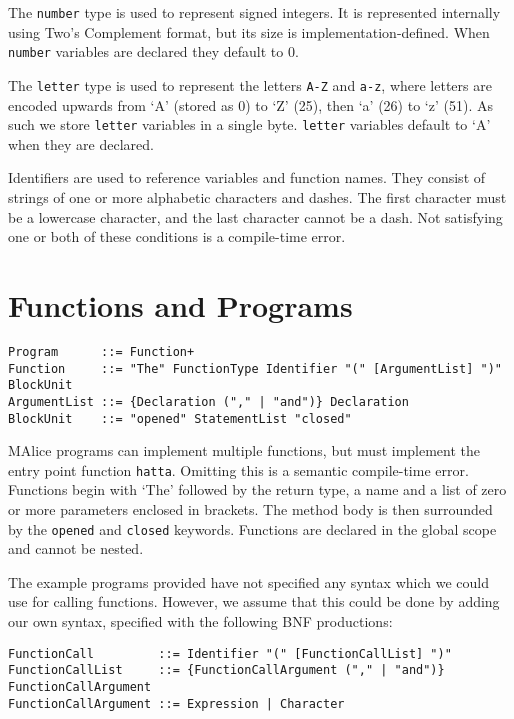 \documentclass[a4wide, 11pt]{article}
\begin{document}
The \texttt{number} type is used to represent signed integers. It is represented internally using Two's Complement format, but its size is implementation-defined. When \texttt{number} variables are declared they default to 0.

The \texttt{letter} type is used to represent the letters \texttt{A-Z} and \texttt{a-z}, where letters are encoded upwards from `A' (stored as 0) to `Z' (25), then `a' (26) to `z' (51). As such we store \texttt{letter} variables in a single byte. \texttt{letter} variables default to `A' when they are declared.

Identifiers are used to reference variables and function names. They consist of strings of one or more alphabetic characters and dashes. The first character must be a lowercase character, and the last character cannot be a dash. Not satisfying one or both of these conditions is a compile-time error.

\section{Functions and Programs}

\begin{verbatim}
Program      ::= Function+
Function     ::= "The" FunctionType Identifier "(" [ArgumentList] ")" BlockUnit
ArgumentList ::= {Declaration ("," | "and")} Declaration
BlockUnit    ::= "opened" StatementList "closed"
\end{verbatim}

MAlice programs can implement multiple functions, but must implement the entry point function \texttt{hatta}. Omitting this is a semantic compile-time error. Functions begin with `The' followed by the return type, a name and a list of zero or more parameters enclosed in brackets. The method body is then surrounded by the \texttt{opened} and \texttt{closed} keywords. Functions are declared in the global scope and cannot be nested.

The example programs provided have not specified any syntax which we could use for calling functions. However, we assume that this could be done by adding our own syntax, specified with the following BNF productions:

\begin{verbatim}
FunctionCall         ::= Identifier "(" [FunctionCallList] ")"
FunctionCallList     ::= {FunctionCallArgument ("," | "and")} FunctionCallArgument
FunctionCallArgument ::= Expression | Character
\end{verbatim}
\end{document}
